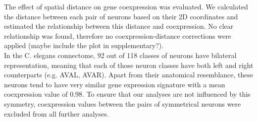 \documentclass[10pt,letterpaper]{article}
\begin{document}
The effect of spatial distance on gene coexpression \cite{Fulcher2015} was evaluated. 
We calculated the distance between each pair of neurons based on their 2D coordinates and estimated the relationship between this distance and coexpression. 
No clear relationship was found, therefore no coexpression-distance corrections were applied (maybe include the plot in supplementary?). \\
In the C. elegans connectome, 92 out of 118 classes of neurons have bilateral representation, meaning that each of those neuron classes have both left and right counterparts (e.g. AVAL, AVAR). 
Apart from their anatomical resemblance, these neurons tend to have very similar gene expression signature with a mean coexpression value of 0.98. 
To ensure that our analyses are not influenced by this symmetry, coexpression values between the pairs of symmetrical neurons were excluded from all further analyses.
\end{document}
